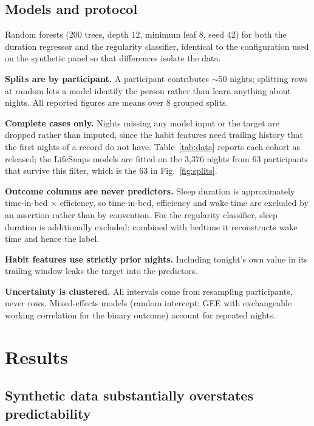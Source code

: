 \documentclass[conference]{IEEEtran}
\begin{document}
\subsection{Models and protocol}

Random forests (200 trees, depth 12, minimum leaf 8, seed 42) for both the
duration regressor and the regularity classifier, identical to the configuration
used on the synthetic panel so that differences isolate the data.

\textbf{Splits are by participant.} A participant contributes ${\sim}50$ nights;
splitting rows at random lets a model identify the person rather than learn
anything about nights. All reported figures are means over 8 grouped splits.

\textbf{Complete cases only.} Nights missing any model input or the target are
dropped rather than imputed, since the habit features need trailing history that
the first nights of a record do not have. Table~\ref{tab:data} reports each
cohort as released; the LifeSnaps models are fitted on the 3{,}376 nights from
63 participants that survive this filter, which is the 63 in
Fig.~\ref{fig:splits}.

\textbf{Outcome columns are never predictors.} Sleep duration is approximately
time-in-bed $\times$ efficiency, so time-in-bed, efficiency and wake time are
excluded by an assertion rather than by convention. For the regularity
classifier, sleep duration is additionally excluded: combined with bedtime it
reconstructs wake time and hence the label.

\textbf{Habit features use strictly prior nights.} Including tonight's own value
in its trailing window leaks the target into the predictors.

\textbf{Uncertainty is clustered.} All intervals come from resampling
participants, never rows. Mixed-effects models (random intercept; GEE with
exchangeable working correlation for the binary outcome) account for repeated
nights.

\section{Results}
\label{sec:results}

\subsection{Synthetic data substantially overstates predictability}
\label{sec:synthgap}
\end{document}
